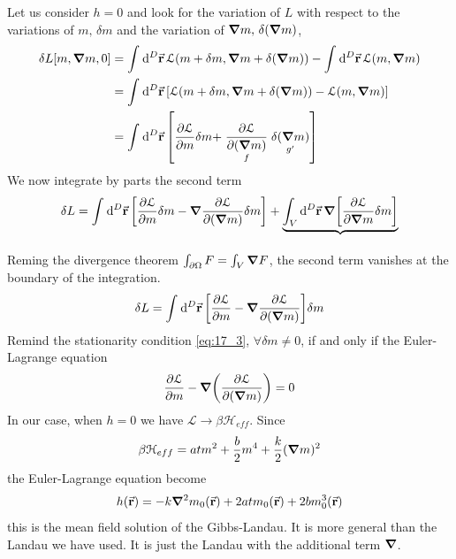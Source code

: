 \documentclass[../main/main.tex]{subfiles}
\begin{document}
Let us consider \( h=0 \) and look for the variation of \( L \) with respect to the variations of \( m,\, \delta m \)  and the variation of \( \grad m, \, \delta (\grad m) \),\begin{equation}
\begin{split}
\delta L [m, \grad m,0]  &=  \int_{}^{} \dd[D]{\va{r}} \mathcal{L} (m+\delta m, \grad m + \delta (\grad m)) - \int_{}^{} \dd[D]{\va{r}} \mathcal{L} (m,\grad m)    \\
& = \int_{}^{} \dd[D]{\va{r}} \qty[\mathcal{L} (m+\delta m, \grad m + \delta ( \grad m)) - \mathcal{L} (m, \grad m)] \\
& = \int_{}^{} \dd[D]{\va{r}} \qty[\pdv{\mathcal{L}}{m} \delta m + \underset{f}{\pdv{\mathcal{L}}{(\grad m)} } \underset{g'}{\delta (\grad m) }  ]
\end{split}
\end{equation}
We now integrate by parts the second term
\begin{equation}
\delta L = \int_{}^{} \dd[D]{\va{r}} \qty[\pdv{\mathcal{L}}{m} \delta m - \grad  \pdv{\mathcal{L}}{(\grad m)} \delta m ] + \underbrace{\int_{V}^{} \dd[D]{\va{r}} \grad \qty[\pdv{\mathcal{L}}{\grad m} \delta m ] }_{}
\end{equation}
Reming the divergence theorem \( \int_{\partial{ \Omega }}^{} F = \int_{V}^{} \grad F     \), the second term vanishes at the boundary of the integration.
\begin{equation}
  \delta L = \int_{}^{} \dd[D]{\va{r}} \qty[\pdv{\mathcal{L}}{m} - \grad \pdv{\mathcal{L}}{(\grad m)}  ] \delta m
\end{equation}
Remind the stationarity condition \eqref{eq:17_3}, \( \forall \delta m \neq 0 \), if and only if  the Euler-Lagrange equation
\begin{equation}
  \pdv{\mathcal{L}}{m} - \grad \qty(\pdv{\mathcal{L}}{(\grad m)} ) = 0
\end{equation}
In our case, when \( h=0 \) we have \( \mathcal{L} \rightarrow \beta \mathcal{H}_{eff} \). Since
\begin{equation}
  \beta \mathcal{H}_{eff} = a t m^2 + \frac{b}{2} m^4 + \frac{k}{2} (\grad m)^2
\end{equation}
the Euler-Lagrange equation become
\begin{equation}
  h (\va{r}) = - k \grad ^2 m_0 (\va{r}) + 2 a t m _0 (\va{r}) + 2 b m_0^3 (\va{r})
   \label{eq:17_4}
\end{equation}
this is the mean field solution of the Gibbs-Landau. It is more general than the Landau we have used. It is just the Landau with the additional term \( \grad  \).
\end{document}
